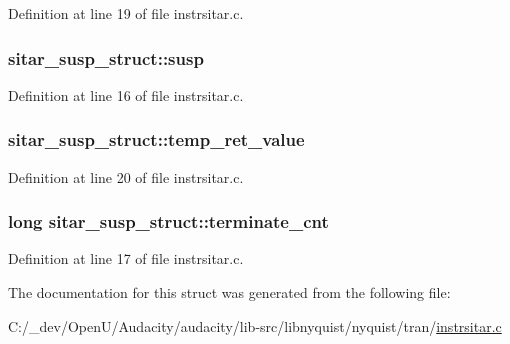 Definition at line 19 of file instrsitar.\+c.

\subsubsection[{\texorpdfstring{susp}{susp}}]{ sitar\+\_\+susp\+\_\+struct\+::susp}\hypertarget{structsitar__susp__struct_aaf113890088bfba50132f3533e7cc3bb}{}\label{structsitar__susp__struct_aaf113890088bfba50132f3533e7cc3bb}


Definition at line 16 of file instrsitar.\+c.

\subsubsection[{\texorpdfstring{temp\+\_\+ret\+\_\+value}{temp_ret_value}}]{ sitar\+\_\+susp\+\_\+struct\+::temp\+\_\+ret\+\_\+value}\hypertarget{structsitar__susp__struct_a4109a5071cf2141133fb3be2043a68d6}{}\label{structsitar__susp__struct_a4109a5071cf2141133fb3be2043a68d6}


Definition at line 20 of file instrsitar.\+c.

\subsubsection[{\texorpdfstring{terminate\+\_\+cnt}{terminate_cnt}}]{\setlength{\rightskip}{0pt plus 5cm}long sitar\+\_\+susp\+\_\+struct\+::terminate\+\_\+cnt}\hypertarget{structsitar__susp__struct_a5b808bff604088cef5107144b06bc303}{}\label{structsitar__susp__struct_a5b808bff604088cef5107144b06bc303}


Definition at line 17 of file instrsitar.\+c.



The documentation for this struct was generated from the following file\+:\begin{DoxyCompactItemize}
\item 
C\+:/\+\_\+dev/\+Open\+U/\+Audacity/audacity/lib-\/src/libnyquist/nyquist/tran/\hyperlink{instrsitar_8c}{instrsitar.\+c}\end{DoxyCompactItemize}
